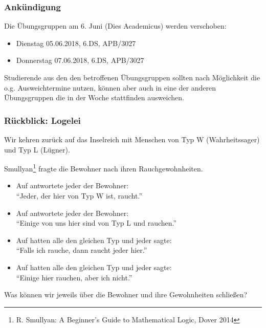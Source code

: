 \documentclass[aspectratio=1610,onlymath]{beamer}
\begin{document}
\maketitle

\begin{frame}\frametitle{Ankündigung}

Die Übungsgruppen am 6. Juni (Dies Academicus) werden verschoben:

\begin{itemize}
\item Dienstag 05.06.2018, 6.DS, APB/3027
\item Donnerstag 07.06.2018, 6.DS, APB/3027
\end{itemize}

Studierende aus den den betroffenen Übungsgruppen sollten nach
Möglichkeit die o.g. Ausweichtermine nutzen, können aber auch in eine
der anderen Übungsgruppen die in der Woche stattfinden ausweichen.

\end{frame}

\begin{frame}\frametitle{Rückblick: Logelei}

Wir kehren zurück auf das Inselreich mit Menschen von
Typ W (Wahrheitssager) und Typ L (Lügner).
\bigskip

Smullyan\footnote{R. Smullyan: A Beginner's Guide to Mathematical Logic, Dover 2014} fragte die Bewohner nach ihren Rauchgewohnheiten.

\begin{itemize}
\item Auf  antwortete jeder der Bewohner:\\ \alert{"`Jeder, der hier von Typ W ist, raucht."'}\\
%
\item Auf  antwortete jeder der Bewohner:\\ \alert{"`Einige von uns hier sind von Typ L und rauchen."'}
%
\item Auf  hatten alle den gleichen Typ und jeder sagte:\\ \alert{"`Falls ich rauche, dann raucht jeder hier."'}
%
\item Auf  hatten alle den gleichen Typ und jeder sagte:\\ \alert{"`Einige hier rauchen, aber ich nicht."'}
\end{itemize}

Was können wir jeweils über die Bewohner und ihre Gewohnheiten schließen?

\end{frame}
\end{document}
